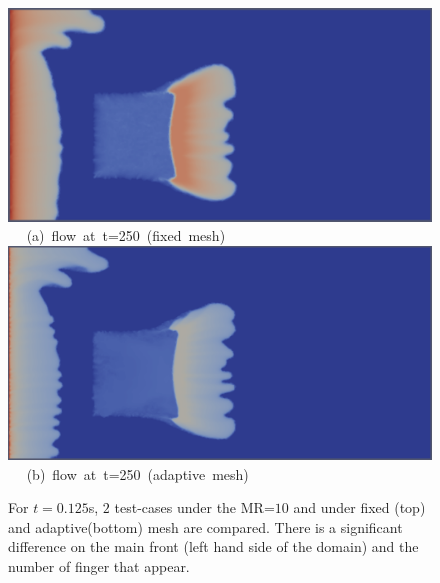 \begin{landscape}
\begin{figure}[ht] 
\vbox{
\hbox{\hspace{3.5cm}
\includegraphics[width=.8\textwidth]{./Pics1/mr10_5regions_fixed/5regions_fixed_250.pdf} 
}
\vspace{0.0cm}
\hbox{\hspace{6.5cm} (a) flow at t=250 (fixed mesh)  
}
\vspace{0.25cm}
\hbox{\hspace{3.5cm}
\includegraphics[width=.8\textwidth]{./Pics1/mr10_5regions_adapt/5regions_adapt_250.pdf}
}
\vspace{0.0cm}
\hbox{\hspace{6.5cm} (b) flow at t=250 (adaptive mesh)    
}
}     
\caption{For $t=0.125$s, $2$ test-cases under the MR=$10$ and under fixed (top) and adaptive(bottom) mesh are compared. There is a significant difference on the main front (left hand side of the domain) and the number of finger that appear.}
\label{fig:2testcase_a}
\end{figure}
\end{landscape}
\clearpage



